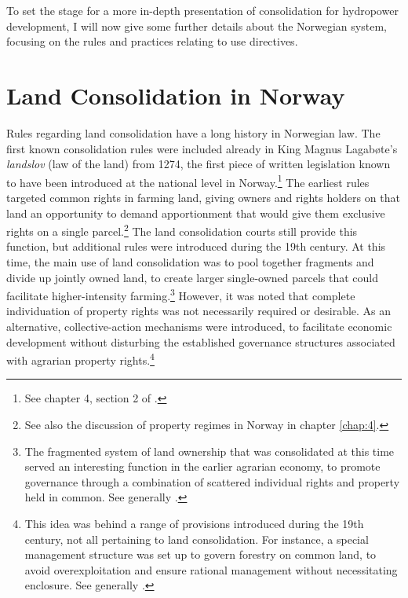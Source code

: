 To set the stage for a more in-depth presentation of consolidation for hydropower development, I will now give some further details about the Norwegian system, focusing on the rules and practices relating to use directives. %


\section{Land Consolidation in Norway}\label{sec:6:3}

Rules regarding land consolidation have a long history in Norwegian law. The first known consolidation rules were included already in King Magnus Lagabøte's \emph{landslov} (law of the land) from 1274, the first piece of written legislation known to have been introduced at the national level in Norway.\footnote{See chapter 4, section 2 of \cite{nou02}.} The earliest rules targeted common rights in farming land, giving owners and rights holders on that land an opportunity to demand apportionment that would give them exclusive rights on a single parcel.\footnote{See also the discussion of property regimes in Norway in chapter \ref{chap:4}.} The land consolidation courts still provide this function, but additional rules were introduced during the 19th century. At this time, the main use of land consolidation was to pool together fragments and divide up jointly owned land, to create larger single-owned parcels that could facilitate higher-intensity farming.\footnote{The fragmented system of land ownership that was consolidated at this time served an interesting function in the earlier agrarian economy, to promote governance through a combination of scattered individual rights and property held in common. See generally \cite{smith00,smith02}.} However, it was noted that complete individuation of property rights was not necessarily required or desirable. As an alternative, collective-action mechanisms were introduced, to facilitate economic development without disturbing the established governance structures associated with agrarian property rights.\footnote{This idea was behind a range of provisions introduced during the 19th century, not all pertaining to land consolidation. For instance, a special management structure was set up to govern forestry on common land, to avoid overexploitation and ensure rational management without necessitating enclosure. See generally \cite{stenseth10a}.}

